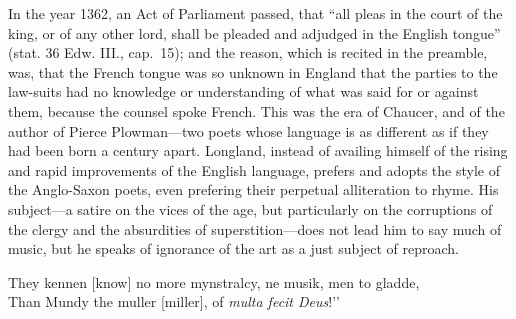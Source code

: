 In the year 1362, an Act of Parliament passed, that “all pleas in the court
of the king, or of any other lord, shall be pleaded and adjudged in the English
tongue” (stat. 36 Edw. III., cap.~15); and the reason, which is recited in the
preamble, was, that the French tongue was so unknown in England that the
parties to the law-suits had no knowledge or understanding of what was said for
or against them, because the counsel spoke French. This was the era of Chaucer,
and of the author of Pierce Plowman—two poets whose language is as different as
if they had been born a century apart. Longland, instead of availing himself of the
rising and rapid improvements of the English language, prefers and adopts the style
of the Anglo-Saxon poets, even prefering their perpetual alliteration to rhyme.
His subject—a satire on the vices of the age, but particularly on the corruptions
of the clergy and the absurdities of superstition—does not lead him to say much
of music, but he speaks of ignorance of the art as a just subject of reproach.
\settowidth{\versewidth}{“They kennen [know] no more mynstralcy, ne musik, men to gladde,}
\begin{scverse}
They kennen [know] no more mynstralcy, ne musik, men to gladde,\\
Than Mundy the muller [miller], of \textit{multa fecit Deus}!’’ 
\end{scverse}

\pagebreak


